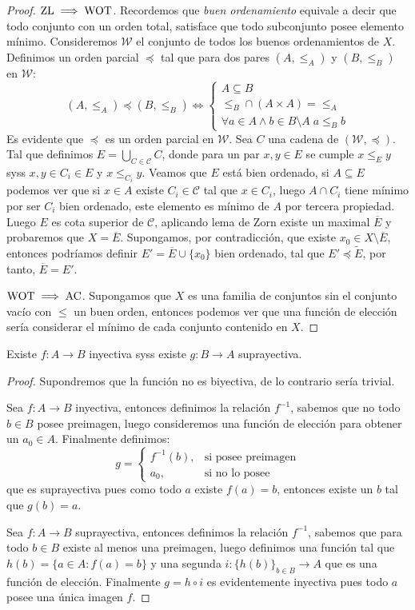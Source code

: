 \documentclass[11pt,oneside,a4paper]{book}
\begin{document}
\begin{proof}
$\rm ZL\implies WOT$. Recordemos que \textit{buen ordenamiento} equivale a decir que todo conjunto con un orden total, satisface que todo subconjunto posee elemento mínimo. Consideremos $\mathcal{W}$ el conjunto de todos los buenos ordenamientos de $X$. Definimos un orden parcial $\preceq$ tal que para dos pares $(A,\leq_A)$ y $(B,\leq_B)$ en $\mathcal{W}$:
$$(A,\leq_A)\preceq(B,\leq_B)\iff\begin{cases}
A\subseteq B\\
\leq_B\cap(A\times A)=\leq_A\\
\forall a\in A\wedge b\in B\setminus A\;a\leq_B b
\end{cases}$$
Es evidente que $\preceq$ es un orden parcial en $\mathcal{W}$. Sea $C$ una cadena de $(\mathcal{W},\preceq)$. Tal que definimos $E=\bigcup_{C\in\mathcal{C}}C$, donde para un par $x,y\in E$ se cumple $x\leq_E y$ syss $x,y\in C_i\in E$ y $x\leq_{C_i}y$. Veamos que $E$ está bien ordenado, si $A\subseteq E$ podemos ver que si $x\in A$ existe $C_i\in\mathcal{C}$ tal que $x\in C_i$, luego $A\cap C_i$ tiene mínimo por ser $C_i$ bien ordenado, este elemento es mínimo de $A$ por tercera propiedad. Luego $E$ es cota superior de $\mathcal{C}$, aplicando lema de Zorn existe un maximal $\overline{E}$ y probaremos que $X=\overline{E}$. Supongamos, por contradicción, que existe $x_0\in X\setminus\overline{E}$, entonces podríamos definir $E'=\overline{E}\cup\{x_0\}$ bien ordenado, tal que $E'\preceq\tilde{E}$, por tanto, $\overline{E}=E'$.

$\rm WOT\implies AC$. Supongamos que $X$ es una familia de conjuntos sin el conjunto vacío con $\leq$ un buen orden, entonces podemos ver que una función de elección sería considerar el mínimo de cada conjunto contenido en $X$.
\end{proof}
\begin{thm}
Existe $f:A\rightarrow B$ inyectiva syss existe $g:B\rightarrow A$ suprayectiva.
\end{thm}
\begin{proof}
Supondremos que la función no es biyectiva, de lo contrario sería trivial.

Sea $f:A\rightarrow B$ inyectiva, entonces definimos la relación $f^{-1}$, sabemos que no todo $b\in B$ posee preimagen, luego consideremos una función de elección para obtener un $a_0\in A$. Finalmente definimos:
$$g=\begin{cases}
f^{-1}(b), &\text{si posee preimagen}\\
a_0, &\text{si no lo posee}
\end{cases}$$
que es suprayectiva pues como todo $a$ existe $f(a)=b$, entonces existe un $b$ tal que $g(b)=a$.

Sea $f:A\rightarrow B$ suprayectiva, entonces definimos la relación $f^{-1}$, sabemos que para todo $b\in B$ existe al menos una preimagen, luego definimos una función tal que $h(b)=\{a\in A:f(a)=b\}$ y una segunda $i:\{h(b)\}_{b\in B}\rightarrow A$ que es una función de elección. Finalmente $g=h\circ i$ es evidentemente inyectiva pues todo $a$ posee una única imagen $f$.
\end{proof}
\end{document}
